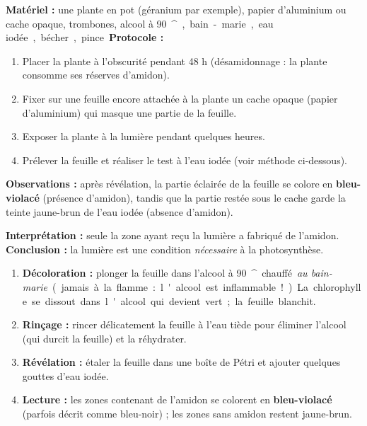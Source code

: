 \documentclass[11pt]{article}
\providecommand{\degree}{^{\circ}}
\newcommand{\cle}[1]{{\popxbold\color{popdark}#1}}
\begin{document}
\begin{experience}
\textbf{Matériel :} une plante en pot (géranium par exemple), papier d'aluminium ou cache opaque, trombones, alcool à \SI{90}{\degree}, bain-marie, \cle{eau iodée}, bécher, pince.

\textbf{Protocole :}
\begin{enumerate}
\item Placer la plante à l'obscurité pendant 48 h (désamidonnage : la plante consomme ses réserves d'amidon).
\item Fixer sur une feuille encore attachée à la plante un cache opaque (papier d'aluminium) qui masque une partie de la feuille.
\item Exposer la plante à la lumière pendant quelques heures.
\item Prélever la feuille et réaliser le test à l'eau iodée (voir méthode ci-dessous).
\end{enumerate}

\textbf{Observations :} après révélation, la partie éclairée de la feuille se colore en \textbf{bleu-violacé} (présence d'amidon), tandis que la partie restée sous le cache garde la teinte jaune-brun de l'eau iodée (absence d'amidon).

\textbf{Interprétation :} seule la zone ayant reçu la lumière a fabriqué de l'amidon. \textbf{Conclusion :} la lumière est une condition \emph{nécessaire} à la photosynthèse.
\end{experience}

\begin{methode}
\begin{enumerate}
\item \textbf{Décoloration :} plonger la feuille dans l'alcool à \SI{90}{\degree} chauffé \emph{au bain-marie} (jamais à la flamme : l'alcool est inflammable !). La chlorophylle se dissout dans l'alcool qui devient vert ; la feuille blanchit.
\item \textbf{Rinçage :} rincer délicatement la feuille à l'eau tiède pour éliminer l'alcool (qui durcit la feuille) et la réhydrater.
\item \textbf{Révélation :} étaler la feuille dans une boîte de Pétri et ajouter quelques gouttes d'\cle{eau iodée}.
\item \textbf{Lecture :} les zones contenant de l'amidon se colorent en \textbf{bleu-violacé} (parfois décrit comme bleu-noir) ; les zones sans amidon restent jaune-brun.
\end{enumerate}
\end{methode}
\end{document}

